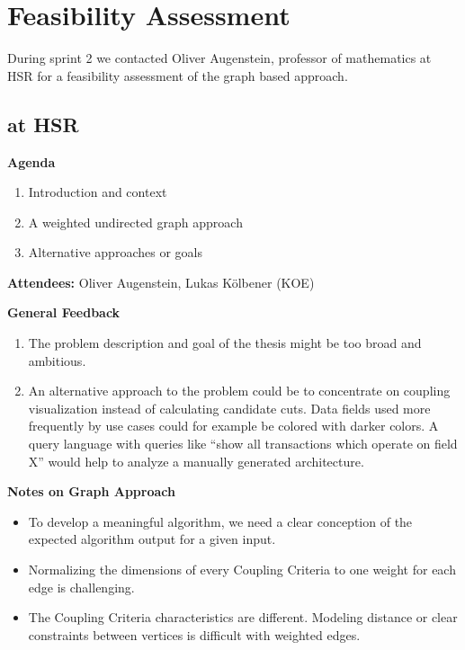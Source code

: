 \section{Feasibility Assessment}
\label{sec:feasibilityAssessment}

During sprint 2 we contacted Oliver Augenstein, professor of mathematics at \gls{HSR} for a feasibility assessment of the graph based approach. 

\subsection{ at HSR}

\textbf{Agenda}

\begin{enumerate}
\item Introduction and context
\item A weighted undirected graph approach
\item Alternative approaches or goals
\end{enumerate}

\textbf{Attendees:} Oliver Augenstein, Lukas Kölbener (KOE)

\textbf{General Feedback}

\begin{enumerate}
	\item The problem description and goal of the thesis might be too broad and ambitious. 
	\item An alternative approach to the problem could be to concentrate on coupling visualization instead of calculating candidate cuts. Data fields used more frequently by use cases could for example be colored with darker colors. A query language with queries like \enquote{show all transactions which operate on field X} would help to analyze a manually generated architecture. 
\end{enumerate}

\textbf{Notes on Graph Approach}

\begin{itemize}
	\item To develop a meaningful algorithm, we need a clear conception of the expected algorithm output for a given input.
	\item Normalizing the dimensions of every Coupling Criteria to one weight for each edge is challenging.  
	\item The Coupling Criteria characteristics are different. Modeling distance or clear constraints between vertices is difficult with weighted edges.
\end{itemize}

